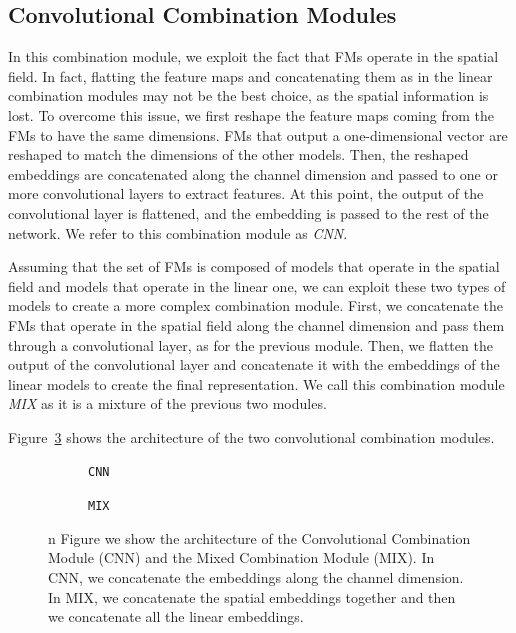 \subsection{Convolutional Combination Modules}
\label{sec:convolutional_combination}
In this combination module, we exploit the fact that FMs operate in the spatial field.
In fact, flatting the feature maps and concatenating them as in the linear combination modules may not be the best choice, as the spatial information is lost.
To overcome this issue, we first reshape the feature maps coming from the FMs to have the same dimensions.
FMs that output a one-dimensional vector are reshaped to match the dimensions of the other models.
Then, the reshaped embeddings are concatenated along the channel dimension and passed to one or more convolutional layers to extract features.
At this point, the output of the convolutional layer is flattened, and the embedding is passed to the rest of the network.
We refer to this combination module as \textit{CNN}.


Assuming that the set of FMs is composed of models that operate in the spatial field and models that operate in the linear one, we can exploit these two types of models to create a more complex combination module.
First, we concatenate the FMs that operate in the spatial field along the channel dimension and pass them through a convolutional layer, as for the previous module.
Then, we flatten the output of the convolutional layer and concatenate it with the embeddings of the linear models to create the final representation.
We call this combination module \textit{MIX} as it is a mixture of the previous two modules.

Figure~\ref{fig:conv_combination} shows the architecture of the two convolutional combination modules.

\begin{figure}[ht]
    \centering
    \begin{subfigure}[b]{0.47\textwidth}
        \centering
        \fbox{\rule[-.5cm]{0cm}{4cm} \rule[-.5cm]{4cm}{0cm}}
        \caption{\texttt{CNN}}
        \label{fig:cnn}
    \end{subfigure}
    \hfill
    \begin{subfigure}[b]{0.47\textwidth}
        \centering
        \fbox{\rule[-.5cm]{0cm}{4cm} \rule[-.5cm]{4cm}{0cm}}
        \caption{\texttt{MIX}}
        \label{fig:mix}
    \end{subfigure}

    \caption{n Figure we show the architecture of the Convolutional Combination Module (CNN) and the Mixed Combination Module (MIX). In CNN, we concatenate the embeddings along the channel dimension. In MIX, we concatenate the spatial embeddings together and then we concatenate all the linear embeddings.}
    \label{fig:conv_combination}
\end{figure}

